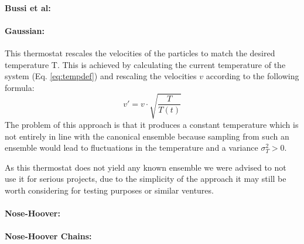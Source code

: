 \paragraph{Bussi et al:}
\paragraph{Gaussian:} This thermostat rescales the velocities of the particles to match the desired temperature T. This is achieved by calculating the current temperature of the system (Eq. \eqref{eq:tempdef}) and rescaling the velocities $v$ according to the following formula:
\begin{equation*}
v'  = v\cdot \sqrt{\frac{T}{T(t)}}
\end{equation*}
The problem of this approach is that it produces a constant temperature which is not entirely in line with the canonical ensemble because sampling from such an ensemble would lead to fluctuations in the temperature and a variance $\sigma_T^2 > 0$.

As this thermostat does not yield any known ensemble we were advised to not use it for serious projects, due to the simplicity of the approach it may still be worth considering for testing purposes or similar ventures.


\paragraph{Nose-Hoover:}
\paragraph{Nose-Hoover Chains:}


